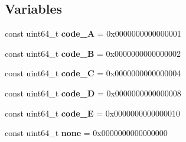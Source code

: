 \subsection*{Variables}
\begin{DoxyCompactItemize}
\item 
\mbox{\label{namespace_g_a_1_1code_aea44a30822438cf5e650b6d4bd20a613}} 
const uint64\+\_\+t {\bfseries code\+\_\+A} = 0x00\textquotesingle{}00\textquotesingle{}00\textquotesingle{}00\textquotesingle{}00\textquotesingle{}00\textquotesingle{}00\textquotesingle{}01
\item 
\mbox{\label{namespace_g_a_1_1code_a12e9a9866e9e7410695ea6c79cb28e5a}} 
const uint64\+\_\+t {\bfseries code\+\_\+B} = 0x00\textquotesingle{}00\textquotesingle{}00\textquotesingle{}00\textquotesingle{}00\textquotesingle{}00\textquotesingle{}00\textquotesingle{}02
\item 
\mbox{\label{namespace_g_a_1_1code_aeea26333730c8856181257501823f1f3}} 
const uint64\+\_\+t {\bfseries code\+\_\+C} = 0x00\textquotesingle{}00\textquotesingle{}00\textquotesingle{}00\textquotesingle{}00\textquotesingle{}00\textquotesingle{}00\textquotesingle{}04
\item 
\mbox{\label{namespace_g_a_1_1code_afbc3e5e443cf687d0486db2452b26031}} 
const uint64\+\_\+t {\bfseries code\+\_\+D} = 0x00\textquotesingle{}00\textquotesingle{}00\textquotesingle{}00\textquotesingle{}00\textquotesingle{}00\textquotesingle{}00\textquotesingle{}08
\item 
\mbox{\label{namespace_g_a_1_1code_a2cafc349b273970f5cbbaece452e48da}} 
const uint64\+\_\+t {\bfseries code\+\_\+E} = 0x00\textquotesingle{}00\textquotesingle{}00\textquotesingle{}00\textquotesingle{}00\textquotesingle{}00\textquotesingle{}00\textquotesingle{}10
\item 
\mbox{\label{namespace_g_a_1_1code_af8cbb1bc81d68690746249ddbf4a238a}} 
const uint64\+\_\+t {\bfseries none} = 0x00\textquotesingle{}00\textquotesingle{}00\textquotesingle{}00\textquotesingle{}00\textquotesingle{}00\textquotesingle{}00\textquotesingle{}00
\end{DoxyCompactItemize}


